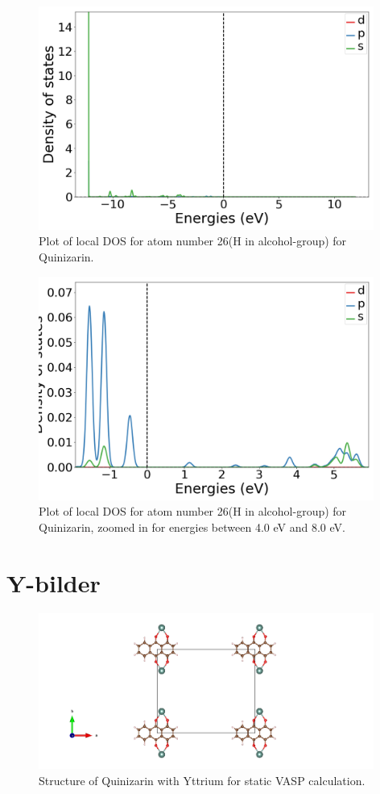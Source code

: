 \documentclass{article}
\begin{document}
  \begin{figure}[H]
      \centering
      \includegraphics[width = 11cm]{../fig/basic_LDOS26_1.png}
      \caption{Plot of local DOS for atom number 26(H in alcohol-group) for Quinizarin. }
      \label{fig:basic_LDOS26_1}
  \end{figure}

  \begin{figure}[H]
      \centering
      \includegraphics[width = 11cm]{../fig/basic_LDOS26_2.png}
      \caption{Plot of local DOS for atom number 26(H in alcohol-group) for Quinizarin, zoomed in for energies between 4.0 eV and 8.0 eV. }
      \label{fig:basic_LDOS26_2}
  \end{figure}

\vspace{1cm}

\section{Y-bilder}

  \begin{figure}[H]
      \centering
      \includegraphics[width = 11cm]{../fig/Y_staticbefore_CONTCAR.png}
      \caption{Structure of Quinizarin with Yttrium for static VASP calculation. }
      \label{fig:Y_staticbefore_CONTCAR}
  \end{figure}
\end{document}
